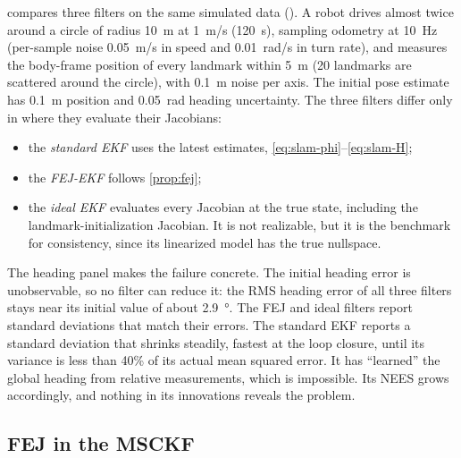  compares three filters on the same simulated data (). A robot drives almost twice around a circle of
radius \SI{10}{m} at \SI{1}{m/s} (\SI{120}{s}), sampling odometry at \SI{10}{Hz} (per-sample noise \SI{0.05}{m/s} in speed and \SI{0.01}{rad/s} in turn
rate), and measures the body-frame position of every landmark within \SI{5}{m} (20 landmarks are scattered around the circle), with \SI{0.1}{m} noise
per axis. The initial pose estimate has \SI{0.1}{m} position and
\SI{0.05}{rad} heading uncertainty. The three filters differ only in where they evaluate their Jacobians:
\begin{itemize}
  \item the \emph{standard EKF} uses the latest estimates, \eqref{eq:slam-phi}--\eqref{eq:slam-H};
  \item the \emph{FEJ-EKF} follows \cref{prop:fej};
  \item the \emph{ideal EKF} evaluates every Jacobian at the true state, including the landmark-initialization Jacobian. It is not realizable, but it is the benchmark for consistency, since its
        linearized model has the true nullspace.
\end{itemize}
The heading panel makes the failure concrete. The initial heading error is unobservable, so no filter can reduce it: the RMS heading
error of all three filters stays near its initial value of about \SI{2.9}{\degree}. The FEJ and ideal filters report standard
deviations that match their errors. The standard EKF reports a standard deviation that shrinks steadily, fastest at the loop closure, until its
variance is less than 40\% of its actual mean squared error. It has ``learned'' the global heading from relative measurements, which is impossible. Its NEES grows accordingly, and nothing in its
innovations reveals the problem.

\subsection{FEJ in the MSCKF}

